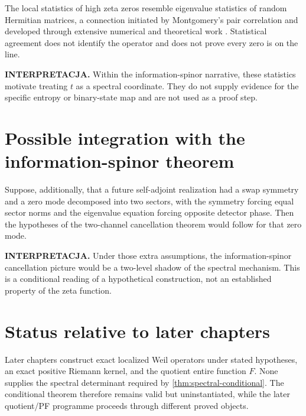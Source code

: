 The local statistics of high zeta zeros resemble eigenvalue statistics of random Hermitian matrices, a connection initiated by Montgomery's pair correlation and developed through extensive numerical and theoretical work \citep{montgomery1973,odlyzko1987,keatingsnaith2000}. Statistical agreement does not identify the operator and does not prove every zero is on the line.

\textbf{INTERPRETACJA.} Within the information-spinor narrative, these statistics motivate treating $t$ as a spectral coordinate. They do not supply evidence for the specific entropy or binary-state map and are not used as a proof step.

\section{Possible integration with the information-spinor theorem}

Suppose, additionally, that a future self-adjoint realization had a swap symmetry and a zero mode decomposed into two sectors, with the symmetry forcing equal sector norms and the eigenvalue equation forcing opposite detector phase. Then the hypotheses of the two-channel cancellation theorem would follow for that zero mode.

\textbf{INTERPRETACJA.} Under those extra assumptions, the information-spinor cancellation picture would be a two-level shadow of the spectral mechanism. This is a conditional reading of a hypothetical construction, not an established property of the zeta function.

\section{Status relative to later chapters}

Later chapters construct exact localized Weil operators under stated hypotheses, an exact positive Riemann kernel, and the quotient entire function $F$. None supplies the spectral determinant required by \cref{thm:spectral-conditional}. The conditional theorem therefore remains valid but uninstantiated, while the later quotient/PF programme proceeds through different proved objects.

